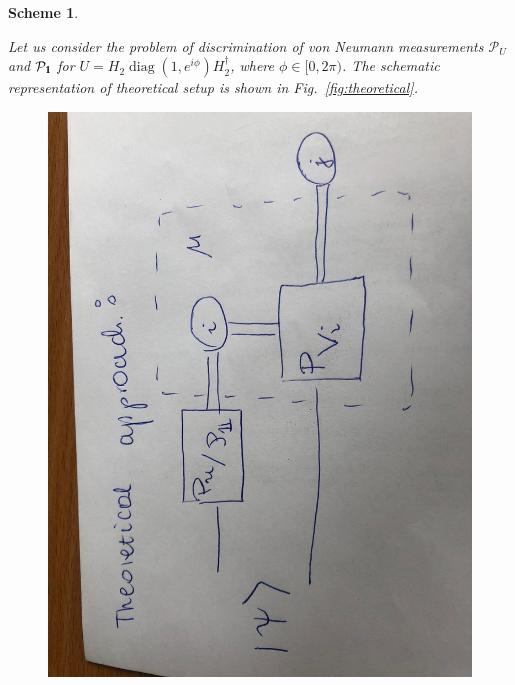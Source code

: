 \documentclass[11pt,a4paper,reqno, oneside]{amsart}
\DeclareMathOperator{\diag}{diag}
\newcommand{\1}{{\rm 1\hspace{-0.9mm}l}}
\newcommand{\Id}{{\rm 1\hspace{-0.9mm}l}}
\newcommand{\PP}{\mathcal{P}}
\newtheorem{scheme}{Scheme}
\begin{document}
\begin{scheme}\label{remark:discriminator}

Let us consider the problem of discrimination of von Neumann measurements 
$\PP_U$
and $\PP_{\Id}$ for $U = H_2 \diag(1, e^{i \phi}) H_2^\dagger$, 
	where $\phi \in [0, 2\pi)$. The schematic representation of theoretical 
	setup is shown in Fig.~\ref{fig:theoretical}. 
\begin{figure}[h!]
	\centering 
	\includegraphics[width=0.75\linewidth, angle=-90]{rys-theoretical.jpg} 
	

\end{figure}
\end{scheme}
\end{document}
